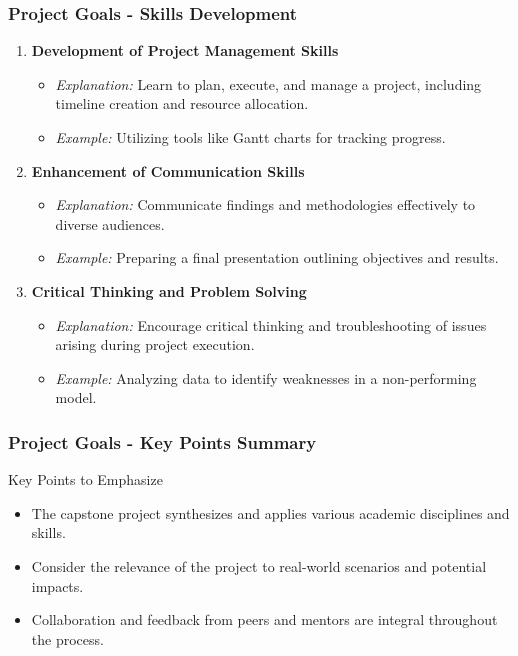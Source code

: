 \documentclass[aspectratio=169]{beamer}
\begin{document}
\begin{frame}[fragile]
    \frametitle{Project Goals - Skills Development}
    \begin{enumerate}[resume]
        \item \textbf{Development of Project Management Skills}
            \begin{itemize}
                \item \textit{Explanation:} Learn to plan, execute, and manage a project, including timeline creation and resource allocation.
                \item \textit{Example:} Utilizing tools like Gantt charts for tracking progress.
            \end{itemize}

        \item \textbf{Enhancement of Communication Skills}
            \begin{itemize}
                \item \textit{Explanation:} Communicate findings and methodologies effectively to diverse audiences.
                \item \textit{Example:} Preparing a final presentation outlining objectives and results.
            \end{itemize}

        \item \textbf{Critical Thinking and Problem Solving}
            \begin{itemize}
                \item \textit{Explanation:} Encourage critical thinking and troubleshooting of issues arising during project execution.
                \item \textit{Example:} Analyzing data to identify weaknesses in a non-performing model.
            \end{itemize}
    \end{enumerate}
\end{frame}

\begin{frame}[fragile]
    \frametitle{Project Goals - Key Points Summary}
    \begin{block}{Key Points to Emphasize}
        \begin{itemize}
            \item The capstone project synthesizes and applies various academic disciplines and skills.
            \item Consider the relevance of the project to real-world scenarios and potential impacts.
            \item Collaboration and feedback from peers and mentors are integral throughout the process.
        \end{itemize}
    \end{block}
\end{frame}
\end{document}
